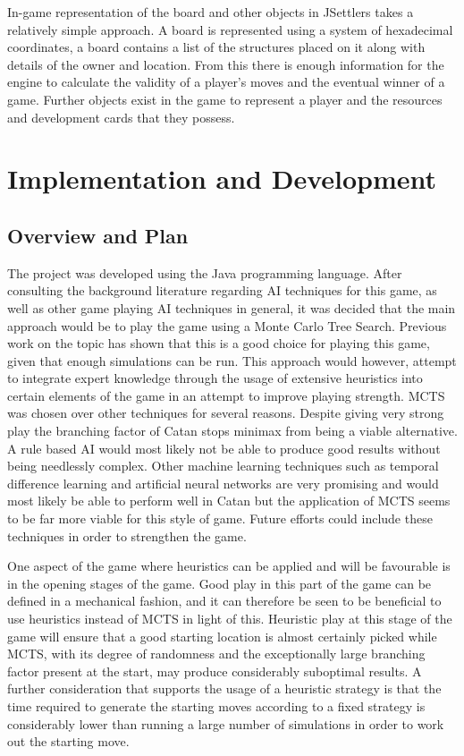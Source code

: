 \documentclass[]{article}
\let\oldsection\section
\renewcommand\section{\clearpage\oldsection}
\begin{document}
\par In-game representation of the board and other objects in JSettlers takes a relatively simple approach. A board is represented using a system of hexadecimal coordinates, a board contains a list of the structures placed on it along with details of the owner and location. From this there is enough information for the engine to calculate the validity of a player's moves and the eventual winner of a game. Further objects exist in the game to represent a player and the resources and development cards that they possess. 


\section{Implementation and Development}

\subsection{Overview and Plan}
The project was developed using the Java programming language. After consulting the background literature regarding AI techniques for this game, as well as other game playing AI techniques in general, it was decided that the main approach would be to play the game using a Monte Carlo Tree Search. Previous work on the topic has shown that this is a good choice for playing this game, given that enough simulations can be run. This approach would however, attempt to integrate expert knowledge through the usage of extensive heuristics into certain elements of the game in an attempt to improve playing strength. MCTS was chosen over other techniques for several reasons. Despite giving very strong play the branching factor of Catan stops minimax from being a viable alternative. A rule based AI would most likely not be able to produce good results without being needlessly complex. Other machine learning techniques such as temporal difference learning and artificial neural networks are very promising and would most likely be able to perform well in Catan but the application of MCTS seems to be far more viable for this style of game. Future efforts could include these techniques in order to strengthen the game.

\par One aspect of the game where heuristics can be applied and will be favourable is in the opening stages of the game. Good play in this part of the game can be defined in a mechanical fashion, and it can therefore be seen to be beneficial to use heuristics instead of MCTS in light of this. Heuristic play at this stage of the game will ensure that a good starting location is almost certainly picked while MCTS, with its degree of randomness and the exceptionally large branching factor present at the start, may produce considerably suboptimal results. A further consideration that supports the usage of a heuristic strategy is that the time required to generate the starting moves according to a fixed strategy is considerably lower than running a large number of simulations in order to work out the starting move.
\end{document}
